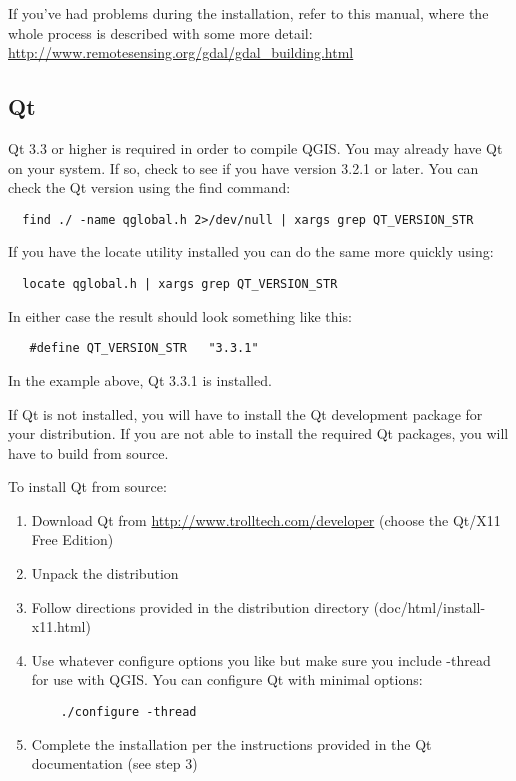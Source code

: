 If you've had problems during the installation, refer to this manual,
where the whole process is described with some more detail:
\url{http://www.remotesensing.org/gdal/gdal\_building.html} 


\subsection{Qt}\label{label_qt}

Qt 3.3 or higher is required in order to compile QGIS. You may already
have Qt on your system. If so, check to see if you have version 3.2.1 or
later. You can check the Qt version using the find command:
  
  \begin{verbatim}
  find ./ -name qglobal.h 2>/dev/null | xargs grep QT_VERSION_STR
  \end{verbatim}
  
If you have the locate utility installed you can do the same more quickly
using:
  
  \begin{verbatim}
  locate qglobal.h | xargs grep QT_VERSION_STR
  \end{verbatim}
  
In either case the result should look something like this:
  
  \begin{verbatim}
   #define QT_VERSION_STR   "3.3.1"
   \end{verbatim} 
   
In the example above, Qt 3.3.1 is installed.
   
If Qt is not installed, you will have to install the Qt development
package for your distribution. If you are not able to install the required
Qt packages, you will have to build from source.
 
To install Qt from source:
  
  \begin{enumerate}
  \item Download Qt from \url{http://www.trolltech.com/developer} (choose
the Qt/X11 Free Edition)
  \item Unpack the distribution
  \item Follow directions provided in the distribution directory
(doc/html/install-x11.html)
  \item Use whatever configure options you like but make sure you include
-thread for use with QGIS. You can configure Qt with minimal options:
  \begin{verbatim}
    ./configure -thread
  \end{verbatim}

  \item Complete the installation per the instructions provided in the Qt
documentation (see step 3)
  \end{enumerate}

